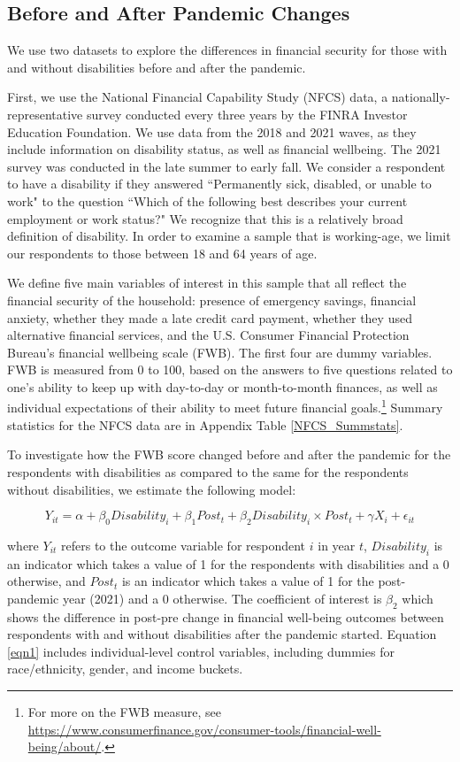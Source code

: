 \documentclass[12pt]{article}
\begin{document}
\subsection{Before and After Pandemic Changes}
We use two datasets to explore the differences in financial security for those with and without disabilities before and after the pandemic. 

First, we use the National Financial Capability Study (NFCS) data, a nationally-representative survey conducted every three years by the FINRA Investor Education Foundation. We use data from the 2018 and 2021 waves, as they include information on disability status, as well as financial wellbeing. The 2021 survey was conducted in the late summer to early fall. We consider a respondent to have a disability if they answered ``Permanently sick, disabled, or unable to work" to the question ``Which of the following best describes your current employment or work status?" We recognize that this is a relatively broad definition of disability. In order to examine a sample that is working-age, we limit our respondents to those between 18 and 64 years of age. 

We define five main variables of interest in this sample that all reflect the financial security of the household: presence of emergency savings, financial anxiety, whether they made a late credit card payment, whether they used alternative financial services, and the U.S. Consumer Financial Protection Bureau's financial wellbeing scale (FWB). The first four are dummy variables. FWB is measured from 0 to 100, based on the answers to five questions related to one's ability to keep up with day-to-day or month-to-month finances, as well as individual expectations of their ability to meet future financial goals.\footnote{For more on the FWB measure, see \url{https://www.consumerfinance.gov/consumer-tools/financial-well-being/about/}.}  Summary statistics for the NFCS data are in Appendix Table \ref{NFCS_Summstats}. 


To investigate how the FWB score changed before and after the pandemic for the respondents with disabilities as compared to the same for the respondents without disabilities, we estimate the following model:

\begin{equation}\label{eqn1}
Y_{it}=\alpha+\beta_0 Disability_i + \beta_1 Post_t+ \beta_2 Disability_i \times Post_t +\gamma X_i + \epsilon_{it} 
\end{equation}

where $Y_{it}$ refers to the outcome variable for respondent $i$ in year $t$, $Disability_i$ is an indicator which takes a value of 1 for the respondents with disabilities and a 0 otherwise, and $Post_t$ is an indicator which takes a value of 1 for the post-pandemic year (2021) and a 0 otherwise. The coefficient of interest is $\beta_2$ which shows the difference in post-pre change in financial well-being outcomes between respondents with and without disabilities after the pandemic started. Equation \ref{eqn1} includes individual-level control variables, including dummies for race/ethnicity, gender, and income buckets. 
\end{document}
